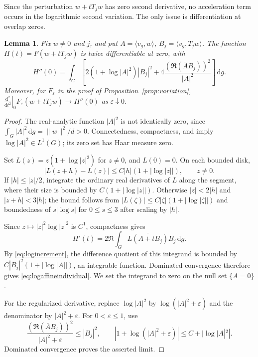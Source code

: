 \documentclass[11pt,reqno]{amsart}
\numberwithin{equation}{section}
\theoremstyle{plain}
\newtheorem{lemma}[theorem]{Lemma}
\theoremstyle{remark}
\newcommand{\dd}{\,\mathrm d}
\newcommand{\norm}[1]{\lVert#1\rVert}
\newcommand{\ip}[2]{\langle#1,#2\rangle}
\begin{document}
Since the perturbation $w+tT_jw$ has zero second derivative, no
acceleration term occurs in the logarithmic second variation. The only issue is differentiation at overlap zeros.
\begin{lemma}\label{lem:log-regularity}\label{lem:regularity}
Fix $w\ne0$ and $j$, and put $A=\ip{v_g}w$, $B_j=\ip{v_g}{T_jw}$.
The function $H(t)=F(w+tT_jw)$ is twice differentiable at zero, with
\begin{equation}\label{eq:logaffineindividual}
 H''(0)=\int_G\left[2(1+\log|A|^2)|B_j|^2
       +4\frac{(\Re(\overline A B_j))^2}{|A|^2}\right]\dd g.
\end{equation}
Moreover, for $F_\varepsilon$ in the proof of
Proposition~\ref{prop:variation},
$\left.\frac{\mathrm d^2}{\mathrm dt^2}\right|_0F_\varepsilon(w+tT_jw)
\to H''(0)$ as $\varepsilon\downarrow0$.
\end{lemma}
\begin{proof}
The real-analytic function $|A|^2$ is not identically zero, since
$\int_G|A|^2\dd g=\norm w^2/d>0$. Connectedness, compactness, and
\cite[Proposition~3.1]{ShiZhang} imply $\log|A|^2\in L^1(G)$;
its zero set has Haar measure zero.

Set $L(z)=z(1+\log|z|^2)$ for $z\ne0$, and $L(0)=0$.
On each bounded disk,
\begin{equation}\label{eq:logincrement}
 |L(z+h)-L(z)|\le C|h|(1+|\log|z||),\qquad z\ne0.
\end{equation}
If $|h|\le |z|/2$, integrate the ordinary real derivatives of $L$
along the segment, where their size is bounded by
$C(1+|\log|z||)$. Otherwise $|z|<2|h|$ and $|z+h|<3|h|$;
the bound follows from $|L(\zeta)|\le C|\zeta|(1+|\log|\zeta||)$
and boundedness of $s|\log s|$ for $0\le s\le3$ after scaling by $|h|$.

Since $z\mapsto|z|^2\log|z|^2$ is $C^1$, compactness gives
\[
 H'(t)=2\Re\int_G\overline{L(A+tB_j)}B_j\dd g.
\]
By \eqref{eq:logincrement}, the difference quotient of this integrand
is bounded by $C|B_j|^2(1+|\log|A||)$, an integrable function.
Dominated convergence therefore gives \eqref{eq:logaffineindividual}.
We set the integrand to zero on the null set $\{A=0\}$.

For the regularized derivative, replace $\log|A|^2$ by
$\log(|A|^2+\varepsilon)$ and the denominator by
$|A|^2+\varepsilon$. For $0<\varepsilon\le1$, use
\[
 \frac{(\Re(\overline A B_j))^2}{|A|^2+\varepsilon}\le |B_j|^2,
 \qquad |1+\log(|A|^2+\varepsilon)|\le C+|\log|A|^2|.
\]
Dominated convergence proves the asserted limit.
\end{proof}
\end{document}
